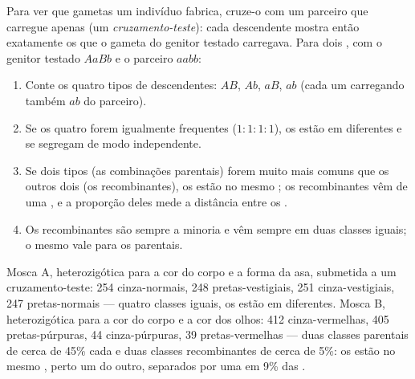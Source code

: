 \begin{method}\label{met:g12:meiosis-genetic-shuffling:testcross}
Para ver que gametas um indivíduo fabrica, cruze-o com um parceiro que
carregue apenas   (um \emph{cruzamento-teste}): cada
descendente mostra então exatamente os  que o gameta do genitor
testado carregava. Para dois , com o genitor testado $AaBb$ e o
parceiro $aabb$:
\begin{enumerate}
  \item Conte os quatro tipos de descendentes: $AB$, $Ab$, $aB$, $ab$
        (cada um carregando também $ab$ do parceiro).
  \item Se os quatro forem igualmente frequentes ($1:1:1:1$), os 
        estão em  diferentes e se segregam de modo
        independente.
  \item Se dois tipos (as combinações parentais) forem muito mais
        comuns que os outros dois (os recombinantes), os  estão no
        mesmo ; os recombinantes vêm de uma , e a
        proporção deles mede a distância entre os .
  \item Os recombinantes são sempre a minoria e vêm sempre em duas
        classes iguais; o mesmo vale para os parentais.
\end{enumerate}
\end{method}

\begin{example}\label{ex:g12:meiosis-genetic-shuffling:fly}
Mosca A, heterozigótica para a cor do corpo e a forma da asa, submetida
a um cruzamento-teste: 254 cinza-normais, 248 pretas-vestigiais, 251
cinza-vestigiais, 247 pretas-normais --- quatro classes iguais, os
 estão em  diferentes. Mosca B, heterozigótica para a
cor do corpo e a cor dos olhos: 412 cinza-vermelhas, 405
pretas-púrpuras, 44 cinza-púrpuras, 39 pretas-vermelhas --- duas
classes parentais de cerca de 45\% cada e duas classes recombinantes de
cerca de 5\%: os  estão no mesmo , perto um do outro,
separados por uma  em 9\% das .
\end{example}


